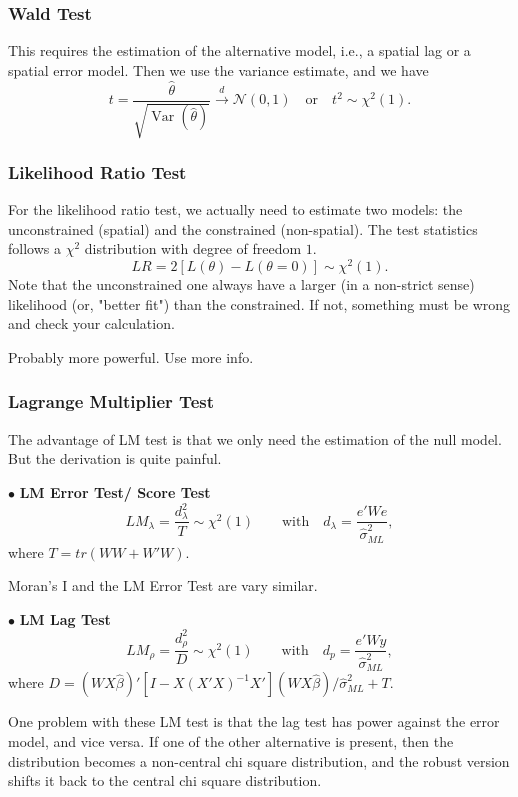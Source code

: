\documentclass[11pt,a4paper]{amsart}
\theoremstyle{plain}
\theoremstyle{definition}
\begin{document}
\subsubsection{Wald Test}\hfill\par 
This requires the estimation of the alternative model, i.e., a spatial lag or a spatial error model. Then we use the variance estimate, and we have 
\[	t = \frac{\hat{\theta}}{\sqrt{\operatorname{Var}(\hat{\theta})}} \stackrel{d}{\longrightarrow} \mathscr{N}(0, 1) \quad \text{or}\quad t^{2} \sim \chi^{2}(1).	\]

\subsubsection{Likelihood Ratio Test}\hfill\par 
For the likelihood ratio test, we actually need to estimate two models: the unconstrained (spatial) and the constrained (non-spatial). The test statistics follows a $\chi^{2}$ distribution with degree of freedom $1$. 
\[	LR = 2[L(\theta) - L(\theta = 0)] \sim \chi^{2}(1).	\]
Note that the unconstrained one always have a larger (in a non-strict sense) likelihood (or, "better fit") than the constrained. If not, something must be wrong and check your calculation.
 
 Probably more powerful. Use more info.
  
\subsubsection{Lagrange Multiplier Test}\hfill\par 
 The advantage of LM test is that we only need the estimation of the null model. But the derivation is quite painful.

$\bullet$ \textbf{LM Error Test/ Score Test}
\[	LM_{\lambda} = \frac{d_{\lambda}^{2}}{T} \sim \chi^{2}(1) \qquad \text{with} \quad d_{\lambda} = \frac{e'We}{\hat{\sigma}^{2}_{ML}},	\]
where $T = tr(WW + W'W)$.

Moran's  I and the LM Error Test are vary similar. 

$\bullet$ \textbf{LM Lag Test} 
\[	LM_{\rho} = \frac{d^{2}_{\rho}}{D} \sim \chi^{2}(1) \qquad  \text{with} \quad d_{p} = \frac{e'Wy}{\hat{\sigma}^{2}_{ML}},	\]
where $D = (WX\hat{\beta})'[I - X(X'X)^{-1}X'](WX\hat{\beta}) / \hat{\sigma}^{2}_{ML} + T$. 

One problem with these LM test is that the lag test has power against the error model, and vice versa. If one of the other alternative is present, then the distribution becomes a non-central chi square distribution, and the robust version shifts it back to the central chi square distribution.
\end{document}
